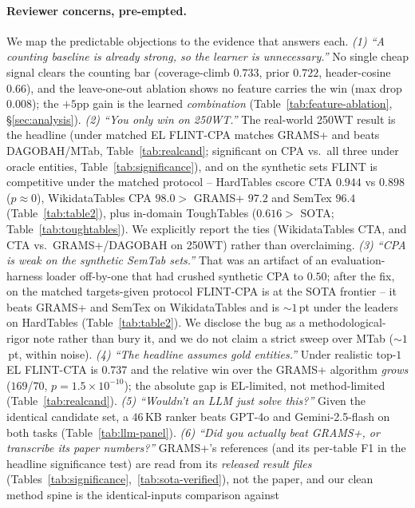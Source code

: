 \paragraph{Reviewer concerns, pre-empted.}
We map the predictable objections to the evidence that answers each.
\emph{(1) ``A counting baseline is already strong, so the learner is unnecessary.''}
No single cheap signal clears the counting bar (coverage-climb $0.733$, prior $0.722$,
header-cosine $0.66$), and the leave-one-out ablation shows no feature carries the win
(max drop $0.008$); the $+5$pp gain is the learned \emph{combination}
(Table~\ref{tab:feature-ablation}, \S\ref{sec:analysis}).
\emph{(2) ``You only win on 250WT.''} The real-world 250WT result is the headline
(under matched EL FLINT-CPA matches GRAMS+ and beats DAGOBAH/MTab, Table~\ref{tab:realcand};
significant on CPA vs.\ all three under oracle entities, Table~\ref{tab:significance}), and on the synthetic sets FLINT is competitive under the
matched protocol -- HardTables cscore CTA $0.944$ vs $0.898$ ($p{\approx}0$),
WikidataTables CPA $98.0 >$ GRAMS+ $97.2$ and SemTex $96.4$
(Table~\ref{tab:table2}), plus in-domain ToughTables ($0.616 >$ SOTA;
Table~\ref{tab:toughtables}). We explicitly report the ties (WikidataTables CTA, and
CTA vs.\ GRAMS+/DAGOBAH on 250WT) rather than overclaiming.
\emph{(3) ``CPA is weak on the synthetic SemTab sets.''} That was an artifact of an
evaluation-harness loader off-by-one that had crushed synthetic CPA to $0.50$; after the
fix, on the matched targets-given protocol FLINT-CPA is at the SOTA frontier -- it beats
GRAMS+ and SemTex on WikidataTables and is $\sim$$1$\,pt under the leaders on HardTables
(Table~\ref{tab:table2}). We disclose the bug as a methodological-rigor note rather than
bury it, and we do not claim a strict sweep over MTab ($\sim$$1$\,pt, within noise).
\emph{(4) ``The headline assumes gold entities.''} Under realistic top-$1$ EL FLINT-CTA
is $0.737$ and the relative win over the GRAMS+ algorithm \emph{grows}
($169$/$70$, $p{=}1.5\times10^{-10}$); the absolute gap is EL-limited, not
method-limited (Table~\ref{tab:realcand}).
\emph{(5) ``Wouldn't an LLM just solve this?''} Given the identical candidate set, a
$46$\,KB ranker beats GPT-4o and Gemini-2.5-flash on both tasks
(Table~\ref{tab:llm-panel}).
\emph{(6) ``Did you actually beat GRAMS+, or transcribe its paper numbers?''} GRAMS+'s
references (and its per-table F1 in the headline significance test) are read from its
\emph{released result files} (Tables~\ref{tab:significance},~\ref{tab:sota-verified}),
not the paper, and our clean method spine is the identical-inputs comparison against
